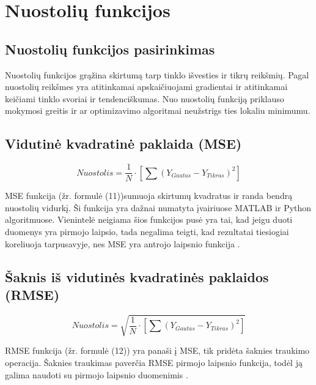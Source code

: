 \documentclass{VUMIFInfKursinis}
\begin{document}


\section{Nuostolių funkcijos}

\subsection{Nuostolių funkcijos pasirinkimas}

\par
Nuostolių funkcijos grąžina skirtumą tarp tinklo išvesties ir tikrų reikšmių. Pagal
nuostolių reikšmes yra atitinkamai apskaičiuojami gradientai ir atitinkamai
keičiami tinklo svoriai ir tendenciškumas. Nuo nuostolių funkciją priklauso
mokymosi greitis ir ar optimizavimo algoritmai neužstrigs ties lokaliu minimumu.

\subsection{Vidutinė kvadratinė paklaida (MSE)}
\begin{equation}
  Nuostolis = \frac{1}{N} \cdot [\sum(Y_{Gautas}-Y_{Tikras})^{2}]
\end{equation}
\par
MSE funkcija (žr. formulė (11))sumuoja skirtumų kvadratus ir randa bendrą nuostolių vidurkį.
Ši funkcija yra dažnai numatyta įvairiuose MATLAB ir Python algoritmuose.
Vienintelė neigiama šios funkcijos pusė yra tai, kad jeigu duoti duomenys yra pirmojo
laipsio, tada negalima teigti, kad rezultatai tiesiogiai koreliuoja tarpusavyje,
nes MSE yra antrojo laipsnio funkcija \cite{salt12}.

\subsection{Šaknis iš vidutinės kvadratinės paklaidos (RMSE)}
\begin{equation}
  Nuostolis = \sqrt{\frac{1}{N} \cdot [\sum (Y_{Gautas}-Y_{Tikras})^{2}]}
\end{equation}
\par
RMSE funkcija (žr. formulė (12)) yra panaši į MSE, tik pridėta šaknies traukimo operacija.
Šaknies traukimas paverčia RMSE pirmojo laipsnio funkcija, todėl ją galima naudoti
su pirmojo laipsnio duomenimis \cite{salt12}.
\end{document}
